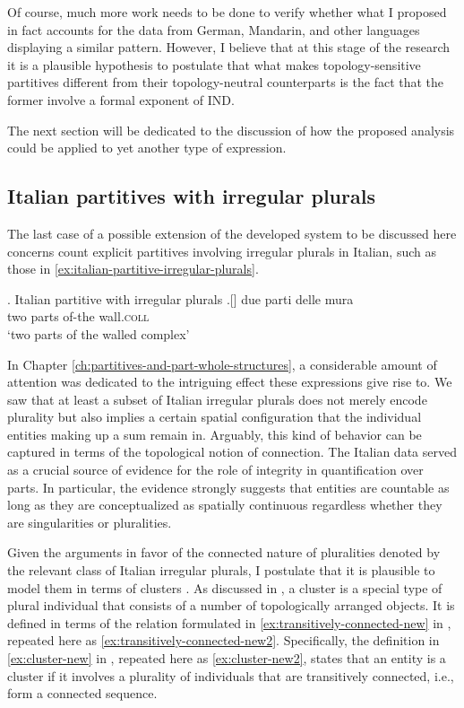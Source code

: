 	Of course, much more work needs to be done to verify whether what I proposed in fact accounts for the data from German, Mandarin, and other languages displaying a similar pattern. However, I believe that at this stage of the research it is a plausible hypothesis to postulate that what makes topology-sensitive partitives different from their topology-neutral counterparts is the fact that the former involve a formal exponent of IND. 
    
    The next section will be dedicated to the discussion of how the proposed analysis could be applied to yet another type of expression.
	
	\subsection{Italian partitives with irregular plurals}\label{sec:italian-partitives-with-irregular-plurals}
	
	The last case of a possible extension of the developed system to be discussed here concerns count explicit partitives involving irregular plurals in Italian, such as those in \ref{ex:italian-partitive-irregular-plurals}. 
	
	\ex. Italian partitive with irregular plurals\label{ex:italian-partitive-irregular-plurals}
	\bg.[] due   parti delle  mura\\
	two parts of-the wall\textsc{.coll}\\
	`two parts of the walled complex'
	
	In Chapter \ref{ch:partitives-and-part-whole-structures}, a considerable amount of attention was dedicated to the intriguing effect these expressions give rise to. We saw that at least a subset of Italian irregular plurals does not merely encode plurality but also implies a certain spatial configuration that the individual entities making up a sum remain in. Arguably, this kind of behavior can be captured in terms of the topological notion of connection. The Italian data served as a crucial source of evidence for the role of integrity in quantification over parts. In particular, the evidence strongly suggests that entities are countable as long as they are conceptualized as spatially continuous regardless whether they are singularities or pluralities.
	
	Given the arguments in favor of the connected nature of pluralities denoted by the relevant class of Italian irregular plurals, I postulate that it is plausible to model them in terms of clusters \citep[see][p. 144]{grimm2012number}. As discussed in , a cluster is a special type of plural individual that consists of a number of topologically arranged objects. It is defined in terms of the  relation formulated in \ref{ex:transitively-connected-new} in , repeated here as \ref{ex:transitively-connected-new2}. Specifically, the definition in \ref{ex:cluster-new} in , repeated here as \ref{ex:cluster-new2}, states that an entity is a cluster if it involves a plurality of individuals that are transitively connected, i.e., form a connected sequence.  
	
